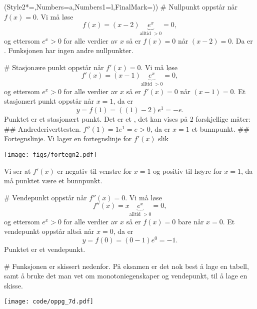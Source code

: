 \begin{easylist}[enumerate]
\ListProperties(Style2*=,Numbers=a,Numbers1=l,FinalMark={)})
# Nullpunkt oppstår når $f(x) = 0$. Vi må løse
\begin{equation*}
	f(x) = (x - 2) \underset{\text{alltid } > 0}{\underbrace{e^x}} = 0,
\end{equation*}
og ettersom $e^x > 0$ for alle verdier av $x$ så er $f(x) = 0$ når $(x-2) = 0$.
Da er .
Funksjonen har ingen andre nullpunkter.

# Stasjonære punkt oppstår når $f'(x) = 0$. Vi må løse
\begin{equation*}
f'(x) = (x - 1) \underset{\text{alltid } > 0}{\underbrace{e^x}} = 0,
\end{equation*}
og ettersom $e^x > 0$ for alle verdier av $x$ så er $f'(x) = 0$ når $(x-1) = 0$.
Et stasjonært punkt oppstår når $x = 1$, da er 
\begin{equation*}
	y = f(1) = ((1) - 2) e^1 = -e.
\end{equation*}
Punktet  er et stasjonært punkt.
Det er et , det kan vises på 2 forskjellige måter:
## Andrederiverttesten. $f''(1) = 1 e^1 = e > 0$, da er $x = 1$ et bunnpunkt.
## Fortegnslinje. Vi lager en fortegnslinje for $f'(x)$ slik
\begin{center}
	\texttt{[image: figs/fortegn2.pdf]}
\end{center}
Vi ser at $f'(x)$ er negativ til venstre for $x = 1$ og positiv til høyre for $x = 1$, da må punktet være et bunnpunkt.

# Vendepunkt oppstår når $f''(x) = 0$. Vi må løse
\begin{equation*}
f''(x) = x \underset{\text{alltid } > 0}{\underbrace{e^x}} = 0,
\end{equation*}
og ettersom $e^x > 0$ for alle verdier av $x$ så er $f(x) = 0$ bare når $x = 0$.
Et vendepunkt oppstår altså når $x = 0$, da er 
\begin{equation*}
y = f(0) = (0 - 1) e^0 = -1.
\end{equation*}
Punktet  er et vendepunkt.


# Funksjonen er skissert nedenfor.
På eksamen er det nok best å lage en tabell, samt å bruke det man vet om monotoniegenskaper og vendepunkt, til å lage en skisse.
\begin{center}
	\texttt{[image: code/oppg\_7d.pdf]}
\end{center}


\end{easylist}

